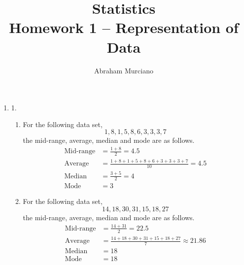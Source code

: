 \documentclass[fleqn]{article}
\title{
	Statistics \\
	\medskip
	\large Homework 1 -- Representation of Data
}
\author{Abraham Murciano}
\newenvironment{answers}{ %
	\begin{enumerate}
		\setlength{\itemsep}{\bigskipamount}
}{\end{enumerate}}
\begin{document}
\maketitle

\begin{answers}

	\item[1.]
	\begin{enumerate}
		\item %
		For the following data set,
		\[1,8,1,5,8,6,3,3,3,7\]
		the mid-range, average, median and mode are as follows.
		\begin{align*}
			\text{Mid-range} &= \frac{1+8}{2} = 4.5 \\
			\text{Average} &= \frac{1+8+1+5+8+6+3+3+3+7}{10} = 4.5 \\
			\text{Median} &= \frac{3+5}{2} = 4 \\
			\text{Mode} &= 3
		\end{align*}

		\item %
		For the following data set,
		\[14,18,30,31,15,18,27\]
		the mid-range, average, median and mode are as follows.
		\begin{align*}
			\text{Mid-range} &= \frac{14+31}{2} = 22.5 \\
			\text{Average} &= \frac{14+18+30+31+15+18+27}{7} \approx 21.86 \\
			\text{Median} &= 18 \\
			\text{Mode} &= 18
		\end{align*}
	\end{enumerate}


\end{answers}
\end{document}
